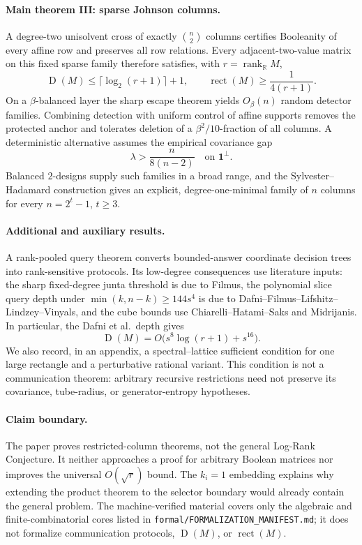 \documentclass[11pt]{article}
\theoremstyle{definition}
\theoremstyle{remark}
\newcommand{\R}{\mathbb R}
\newcommand{\1}{\mathbf 1}
\newcommand{\rank}{\operatorname{rank}}
\newcommand{\rect}{\operatorname{rect}}
\newcommand{\Dcc}{\operatorname{D}}
\begin{document}
\paragraph{Main theorem III: sparse Johnson columns.}
A degree-two unisolvent cross of exactly \(\binom n2\) columns certifies
Booleanity of every affine row and preserves all row relations.  Every
adjacent-two-value matrix on this fixed sparse family therefore satisfies,
with \(r=\rank_{\R}M\),
\[
 \Dcc(M)\le\lceil\log_2(r+1)\rceil+1,\qquad
 \rect(M)\ge\frac1{4(r+1)}.
\]
On a \(\beta\)-balanced layer the sharp escape theorem yields
\(O_\beta(n)\) random detector families.  Combining detection with uniform
control of affine supports removes the protected anchor and tolerates
deletion of a \(\beta^2/10\)-fraction of all columns.  A deterministic
alternative assumes the empirical covariance gap
\[
 \lambda>\frac{n}{8(n-2)}
 \quad\text{on }\mathbf1^\perp.
\]
Balanced \(2\)-designs supply such families in a broad range, and the
Sylvester--Hadamard construction gives an explicit, degree-one-minimal family
of \(n\) columns for every \(n=2^t-1\), \(t\ge3\).

\paragraph{Additional and auxiliary results.}
A rank-pooled query theorem converts bounded-answer coordinate decision trees
into rank-sensitive protocols.  Its low-degree consequences use literature
inputs: the sharp fixed-degree junta threshold is due to Filmus, the
polynomial slice query depth under
\(\min(k,n-k)\ge144s^4\) is due to
Dafni--Filmus--Lifshitz--Lindzey--Vinyals, and the cube bounds use
Chiarelli--Hatami--Saks and Midrijanis.  In particular, the Dafni et al.\
depth gives
\[
 \Dcc(M)=O\bigl(s^8\log(r+1)+s^{16}\bigr).
\]
We also record, in an appendix, a spectral--lattice sufficient condition for
one large rectangle and a perturbative rational variant.  This condition is
not a communication theorem: arbitrary recursive restrictions need not
preserve its covariance, tube-radius, or generator-entropy hypotheses.

\paragraph{Claim boundary.}
The paper proves restricted-column theorems, not the general Log-Rank
Conjecture.  It neither approaches a proof for arbitrary Boolean matrices nor
improves the universal \(O(\sqrt r)\) bound.  The \(k_i=1\) embedding explains
why extending the product theorem to the selector boundary would already
contain the general problem.  The machine-verified material covers only the
algebraic and finite-combinatorial cores listed in
\nolinkurl{formal/FORMALIZATION_MANIFEST.md}; it does not formalize
communication protocols, \(\Dcc(M)\), or \(\rect(M)\).
\end{document}
